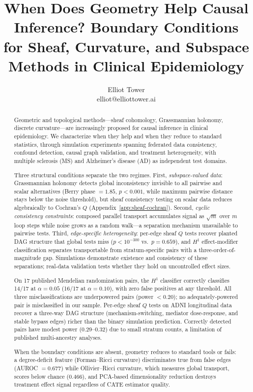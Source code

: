 \documentclass{article}
\title{When Does Geometry Help Causal Inference? Boundary Conditions for Sheaf, Curvature, and Subspace Methods in Clinical Epidemiology}
\author{\name Elliot Tower \\
      \email elliot@elliottower.ai}
\begin{document}
\maketitle

\begin{abstract}
Geometric and topological methods---sheaf cohomology, Grassmannian holonomy, discrete curvature---are increasingly proposed for causal inference in clinical epidemiology. We characterize when they help and when they reduce to standard statistics, through simulation experiments spanning federated data consistency, confound detection, causal graph validation, and treatment heterogeneity, with multiple sclerosis (MS) and Alzheimer's disease (AD) as independent test domains.

Three structural conditions separate the two regimes. First, \emph{subspace-valued data}: Grassmannian holonomy detects global inconsistency invisible to all pairwise and scalar alternatives (Berry phase $= 1.85$, $p < 0.001$, while maximum pairwise distance stays below the noise threshold), but sheaf consistency testing on scalar data reduces algebraically to Cochran's $Q$ (Appendix~\ref{app:sheaf-cochran}). Second, \emph{cyclic consistency constraints}: composed parallel transport accumulates signal as $\sqrt{m}$ over $m$ loop steps while noise grows as a random walk---a separation mechanism unavailable to pairwise tests. Third, \emph{edge-specific heterogeneity}: per-edge sheaf $Q$ tests recover planted DAG structure that global tests miss ($p < 10^{-300}$ vs.\ $p = 0.659$), and $H^1$ effect-modifier classification separates transportable from stratum-specific pairs with a three-order-of-magnitude gap. Simulations demonstrate existence and consistency of these separations; real-data validation tests whether they hold on uncontrolled effect sizes.

On 17 published Mendelian randomization pairs, the $H^1$ classifier correctly classifies 14/17 at $\alpha = 0.05$ (16/17 at $\alpha = 0.10$), with zero false positives at any threshold. All three misclassifications are underpowered pairs (power $< 0.20$); no adequately-powered pair is misclassified in our sample. Per-edge sheaf $Q$ tests on ADNI longitudinal data recover a three-way DAG structure (mechanism-switching, mediator dose-response, and stable bypass edges) richer than the binary simulation prediction. Correctly detected pairs have modest power (0.29--0.32) due to small stratum counts, a limitation of published multi-ancestry analyses.

When the boundary conditions are absent, geometry reduces to standard tools or fails: a degree-deficit feature (Forman--Ricci curvature) discriminates true from false edges (AUROC $= 0.677$) while Ollivier--Ricci curvature, which measures global transport, scores below chance ($0.466$), and PCA-based dimensionality reduction destroys treatment effect signal regardless of CATE estimator quality.
\end{abstract}
\end{document}
